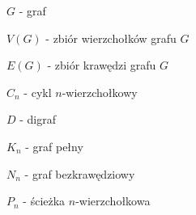 $G$ - graf

$V(G)$ - zbiór wierzchołków grafu $G$

$E(G)$ - zbiór krawędzi grafu $G$

$C_n$ - cykl $n$-wierzchołkowy

$D$ - digraf

$K_n$ - graf pełny

$N_n$ - graf bezkrawędziowy

$P_n$ - ścieżka $n$-wierzchołkowa